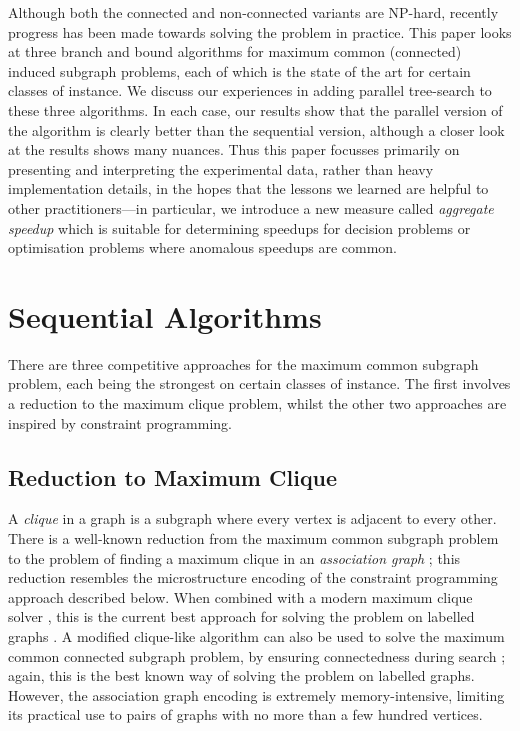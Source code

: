 \documentclass{llncs}
\begin{document}
Although both the connected and non-connected variants are NP-hard, recently progress has been made
towards solving the problem in practice.  This paper looks at three branch and bound algorithms for
maximum common (connected) induced subgraph problems, each of which is the state of the art for
certain classes of instance. We discuss our experiences in adding parallel tree-search to these
three algorithms. In each case, our results show that the parallel version of the algorithm is
clearly better than the sequential version, although a closer look at the results shows many
nuances. Thus this paper focusses primarily on presenting and interpreting the experimental data,
rather than heavy implementation details, in the hopes that the lessons we learned are helpful to
other practitioners---in particular, we introduce a new measure called \emph{aggregate speedup}
which is suitable for determining speedups for decision problems or optimisation problems where
anomalous speedups are common.

\section{Sequential Algorithms}

There are three competitive approaches for the maximum common subgraph problem, each being the
strongest on certain classes of instance. The first involves a reduction to the maximum clique
problem, whilst the other two approaches are inspired by constraint programming.

\subsection{Reduction to Maximum Clique}

A \emph{clique} in a graph is a subgraph where every vertex is adjacent to every other. There is a
well-known reduction from the maximum common subgraph problem to the problem of finding a maximum
clique in an \emph{association graph}
\cite{o:Levi73,DBLP:journals/jcamd/RaymondW02a,DBLP:conf/cp/McCreeshNPS16}; this reduction
resembles the microstructure encoding \cite{DBLP:conf/aaai/Jegou93a} of the constraint programming
approach described below. When combined with a modern maximum clique solver
\cite{DBLP:journals/ol/SegundoMRH13}, this is the current best approach for solving the problem on
labelled graphs \cite{DBLP:conf/cp/McCreeshNPS16}. A modified clique-like algorithm can also be
used to solve the maximum common connected subgraph problem, by ensuring connectedness during search
\cite{DBLP:conf/cp/McCreeshNPS16}; again, this is the best known way of solving the problem on
labelled graphs. However, the association graph encoding is extremely memory-intensive, limiting its
practical use to pairs of graphs with no more than a few hundred vertices.
\end{document}
